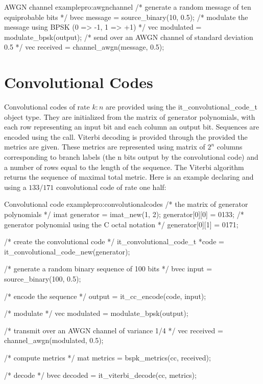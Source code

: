 \begin{program}{AWGN channel example}{pro:awgnchannel}
  /* generate a random message of ten equiprobable bits */
  bvec message = source_binary(10, 0.5);
  /* modulate the message using BPSK (0 => -1, 1 => +1) */
  vec modulated = modulate_bpsk(output);
  /* send over an AWGN channel of standard deviation 0.5 */ 
  vec received = channel_awgn(message, 0.5);
\end{program}


\section{Convolutional Codes}
\label{sec:convolutionalcodes}

     Convolutional codes of rate $k:n$ are provided using the
it\_convolutional\_code\_t object type. They are initialized from the
matrix of generator polynomials, with each row representing an input
bit and each column an output bit. Sequences are encoded using the
call. Viterbi decoding is provided through the 
 provided
the metrics are given. These metrics are represented using matrix of
$2^n$ columns corresponding to branch labels (the n bits output by the
convolutional code) and a number of rows equal to the length of the
sequence. The Viterbi algorithm returns the sequence of maximal total
metric. Here is an example declaring and using a $133/171$ convolutional
code of rate one half: 

\begin{program}{Convolutional code example}{pro:convolutionalcodes}
  /* the matrix of generator polynomials */
  imat generator = imat_new(1, 2); 
  generator[0][0] = 0133; /* generator polynomial using the C octal notation */
  generator[0][1] = 0171;

  /* create the convolutional code */
  it_convolutional_code_t *code = it_convolutional_code_new(generator);

  /* generate a random binary sequence of 100 bits */
  bvec input = source_binary(100, 0.5);

  /* encode the sequence */
  output = it_cc_encode(code, input);

  /* modulate */
  vec modulated = modulate_bpsk(output);

  /* transmit over an AWGN channel of variance 1/4 */
  vec received = channel_awgn(modulated, 0.5);
 
  /* compute metrics */
  mat metrics = bspk_metrics(cc, received);

  /* decode */
  bvec decoded = it_viterbi_decode(cc, metrics);
\end{program}
